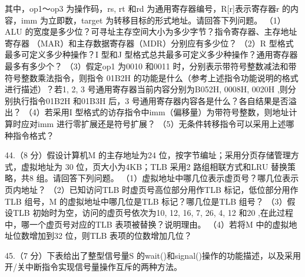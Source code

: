 \documentclass[UTF8,11pt]{ctexart}
\begin{document}
其中，op1～op3 为操作码，rs, rt 和rd 为通用寄存器编号，R[r]表示寄存器r 的内容，imm 为立即数，target 为转移目标的形式地址。请回答下列问题。 （1）ALU 的宽度是多少位？可寻址主存空间大小为多少字节？指令寄存器、主存地址寄存器 （MAR）和主存数据寄存器（MDR）分别应有多少位？ （2）R 型格式最多可定义多少种操作？I 型和J 型格式总共最多可定义多少种操作？通用寄存器最多有多少个？ （3）假定op1 为0010 和0011 时，分别表示带符号整数减法和带符号整数乘法指令，则指令 01B2H 的功能是什么（参考上述指令功能说明的格式进行描述）？若1, 2, 3 号通用寄存器当前内容分别为B052H, 0008H, 0020H ,则分别执行指令01B2H 和01B3H 后，3 号通用寄存器内容各是什么？各自结果是否溢出？ （4）若采用I 型格式的访存指令中imm（偏移量）为带符号整数，则地址计算时应对imm 进行零扩展还是符号扩展？ （5）无条件转移指令可以采用上述哪种指令格式？


44.（8 分）假设计算机M 的主存地址为24 位，按字节编址；采用分页存储管理方式，虚拟地址为 30 位，页大小为4KB；TLB 采用2 路组相联方式和LRU 替换策略，共8 组。请回答下列问题。 （1）虚拟地址中哪几位表示虚页号？哪几位表示页内地址？ （2）已知访问TLB 时虚页号高位部分用作TLB 标记，低位部分用作TLB 组号，M 的虚拟地址中哪几位是TLB 标记？哪几位是TLB 组号？ （3）假设TLB 初始时为空，访问的虚页号依次为10, 12, 16, 7, 26, 4, 12 和20 ,在此过程中，哪一个虚页号对应的TLB 表项被替换？说明理由。 （4）若将M 中的虚拟地址位数增加到32 位，则TLB 表项的位数增加几位？


45.（7 分）下表给出了整型信号量S 的wait()和signal()操作的功能描述，以及采用开/关中断指令实现信号量操作互斥的两种方法。 
\end{document}
